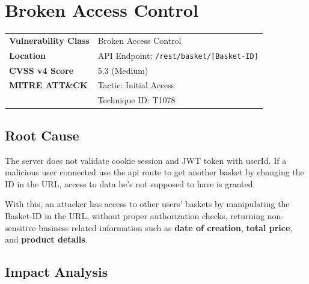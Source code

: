 \documentclass[11pt,a4paper]{report}
\begin{document}
        
        \section{Broken Access Control}

        \vspace{0.3cm}
        
        \begin{tcolorbox}[colback=lightgray,colframe=headerblack,title=\textbf{Vulnerability Overview}]
        \begin{tabular}{>{\bfseries}p{5cm} p{10cm}}
        Vulnerability Class & Broken Access Control \\

        Location & API Endpoint: \texttt{/rest/basket/[Basket-ID]} \\

        CVSS v4 Score & 5.3 (Medium) \\

        MITRE ATT\&CK & Tactic: Initial Access \\
                    & Technique ID: T1078 \\
        \end{tabular}
        \end{tcolorbox}

        \subsection{Root Cause}

        The server does not validate cookie session and JWT token with userId. If a malicious user connected use the api route to get another basket by changing the ID in the URL, access to data he's not supposed to have is granted.

        With this, an attacker has access to other users' baskets by manipulating the Basket-ID in the URL, without proper authorization checks, returning non-sensitive business related information such as \textbf{date of creation}, \textbf{total price}, and \textbf{product details}.

        \subsection{Impact Analysis}
\end{document}
